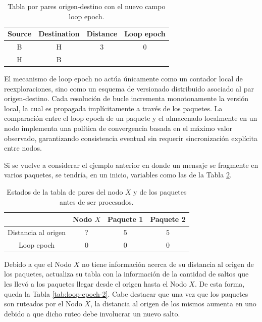 \begin{table}[]
    \centering
    \begin{tabular}{|c|c|c|c|}
        \hline
        Source & Destination & Distance & Loop epoch \\
        \hline
        B & H & 3 & 0 \\
        \hline
        H & B & & \\
        \hline
    \end{tabular}
    \caption{Tabla por pares origen-destino con el nuevo campo loop epoch.}
    \label{tab:pair-table-new}
\end{table}

El mecanismo de loop epoch no actúa únicamente como un contador local de reexploraciones, sino como un esquema de versionado distribuido asociado al par origen-destino. Cada resolución de bucle incrementa monotonamente la versión local, la cual es propagada implícitamente a través de los paquetes. La comparación entre el loop epoch de un paquete y el almacenado localmente en un nodo implementa una política de convergencia basada en el máximo valor observado, garantizando consistencia eventual sin requerir sincronización explícita entre nodos.

Si se vuelve a considerar el ejemplo anterior en donde un mensaje se fragmente en varios paquetes, se tendría, en un inicio, variables como las de la Tabla \ref{tab:loop-epoch-1}.

\begin{table}[]
    \centering
    \begin{tabular}{|c|c|c|c|}
        \hline
        & Nodo $X$ & Paquete 1 & Paquete 2 \\
        \hline
        Distancia al origen & ? & 5 & 5 \\
        \hline
        Loop epoch & 0 & 0 & 0 \\
        \hline
    \end{tabular}
    \caption{Estados de la tabla de pares del nodo $X$ y de los paquetes antes de ser procesados.}
    \label{tab:loop-epoch-1}
\end{table}

Debido a que el Nodo $X$ no tiene información acerca de su distancia al origen de los paquetes, actualiza su tabla con la información de la cantidad de saltos que les llevó a los paquetes llegar desde el origen hasta el Nodo $X$. De esta forma, queda la Tabla \ref{tab:loop-epoch-2}. Cabe destacar que una vez que los paquetes son ruteados por el Nodo $X$, la distancia al origen de los mismos aumenta en uno debido a que dicho ruteo debe involucrar un nuevo salto.

